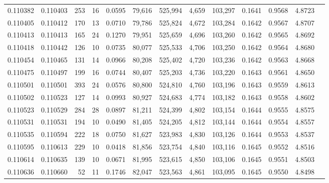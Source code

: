 \begin{tabular}{rrrrrrrrrrrrr}
0.110382 & 0.110403 &   253 &  16 &                                     0.0595 &  79,616 & 525,994 &   4,659 & 103,297 & 0.1641 & 0.9568 & 4.8723 \\
0.110405 & 0.110412 &   170 &  13 &                                     0.0710 &  79,786 & 525,824 &   4,672 & 103,284 & 0.1642 & 0.9567 & 4.8707 \\
0.110413 & 0.110413 &   165 &  24 &                                     0.1270 &  79,951 & 525,659 &   4,696 & 103,260 & 0.1642 & 0.9565 & 4.8692 \\
0.110418 & 0.110442 &   126 &  10 &                                     0.0735 &  80,077 & 525,533 &   4,706 & 103,250 & 0.1642 & 0.9564 & 4.8680 \\
0.110454 & 0.110465 &   131 &  14 &                                     0.0966 &  80,208 & 525,402 &   4,720 & 103,236 & 0.1642 & 0.9563 & 4.8668 \\
0.110475 & 0.110497 &   199 &  16 &                                     0.0744 &  80,407 & 525,203 &   4,736 & 103,220 & 0.1643 & 0.9561 & 4.8650 \\
0.110501 & 0.110501 &   393 &  24 &                                     0.0576 &  80,800 & 524,810 &   4,760 & 103,196 & 0.1643 & 0.9559 & 4.8613 \\
0.110502 & 0.110523 &   127 &  14 &                                     0.0993 &  80,927 & 524,683 &   4,774 & 103,182 & 0.1643 & 0.9558 & 4.8602 \\
0.110523 & 0.110529 &   284 &  28 &                                     0.0897 &  81,211 & 524,399 &   4,802 & 103,154 & 0.1644 & 0.9555 & 4.8575 \\
0.110531 & 0.110531 &   194 &  10 &                                     0.0490 &  81,405 & 524,205 &   4,812 & 103,144 & 0.1644 & 0.9554 & 4.8557 \\
0.110535 & 0.110594 &   222 &  18 &                                     0.0750 &  81,627 & 523,983 &   4,830 & 103,126 & 0.1644 & 0.9553 & 4.8537 \\
0.110595 & 0.110613 &   229 &  10 &                                     0.0418 &  81,856 & 523,754 &   4,840 & 103,116 & 0.1645 & 0.9552 & 4.8516 \\
0.110614 & 0.110635 &   139 &  10 &                                     0.0671 &  81,995 & 523,615 &   4,850 & 103,106 & 0.1645 & 0.9551 & 4.8503 \\
0.110636 & 0.110660 &    52 &  11 &                                     0.1746 &  82,047 & 523,563 &   4,861 & 103,095 & 0.1645 & 0.9550 & 4.8498 \\

\end{tabular}
